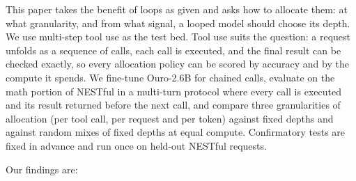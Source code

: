 This paper takes the benefit of loops as given and asks how to allocate them: at what
granularity, and from what signal, a looped model should choose its depth. We use multi-step
tool use as the test bed. Tool use suits the question: a request unfolds
as a sequence of calls, each call is executed, and the final result can be checked exactly, so
every allocation policy can be scored by accuracy and by the compute it spends. We fine-tune
Ouro-2.6B for chained calls, evaluate on the math portion of NESTful \citep{basu2024nestful}
in a multi-turn protocol where every call is executed and its result returned before the next
call, and compare three granularities of allocation (per tool call, per request and per token)
against fixed depths and against random mixes of fixed depths at equal compute. Confirmatory tests are fixed in advance and run once on held-out NESTful
requests.

Our findings are:

